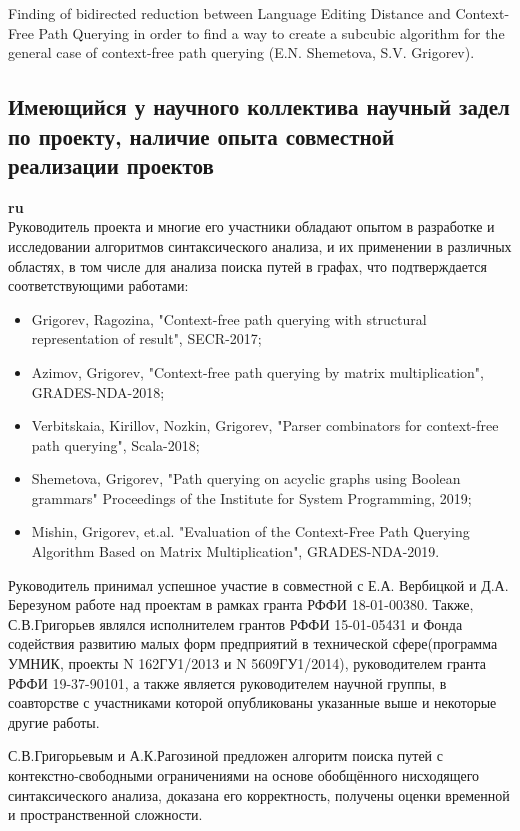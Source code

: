 \documentclass[12pt]{article}  %
\theoremstyle{remark}
\begin{document}
Finding of bidirected reduction between Language Editing Distance and Context-Free Path Querying in order to find a way to create a subcubic algorithm for the general case of context-free path querying (E.N. Shemetova, S.V. Grigorev).

\subsection{Имеющийся у научного коллектива научный задел по проекту, наличие опыта совместной реализации проектов}

\textbf{ru}\\
%
Руководитель проекта и многие его участники обладают опытом в разработке и исследовании алгоритмов синтаксического анализа, и их применении в различных областях, в том числе для анализа поиска путей в графах, что подтверждается соответствующими работами:
\begin{itemize}
  \item Grigorev, Ragozina, "Context-free path querying with structural representation of result", SECR-2017;
  \item Azimov, Grigorev, "Context-free path querying by matrix multiplication", GRADES-NDA-2018;
  \item Verbitskaia, Kirillov, Nozkin, Grigorev, "Parser combinators for context-free path querying", Scala-2018;
  \item Shemetova, Grigorev, "Path querying on acyclic graphs using Boolean grammars" Proceedings of the Institute for System Programming, 2019;
  \item Mishin, Grigorev, et.al. "Evaluation of the Context-Free Path Querying Algorithm Based on Matrix Multiplication", GRADES-NDA-2019.
\end{itemize}

Руководитель принимал успешное участие в совместной с Е.А. Вербицкой и Д.А. Березуном работе над проектам в рамках гранта РФФИ 18-01-00380.
Также, С.В.Григорьев являлся исполнителем грантов РФФИ 15-01-05431 и Фонда содействия развитию малых форм предприятий в технической сфере(программа УМНИК, проекты N 162ГУ1/2013 и N 5609ГУ1/2014), руководителем гранта РФФИ 19-37-90101, а также является руководителем научной группы, в соавторстве с участниками которой опубликованы указанные выше и некоторые другие работы.

С.В.Григорьевым и А.К.Рагозиной предложен алгоритм поиска путей с контекстно-свободными ограничениями на основе обобщённого нисходящего синтаксического анализа, доказана его корректность, получены оценки временной и пространственной сложности.
\end{document}
